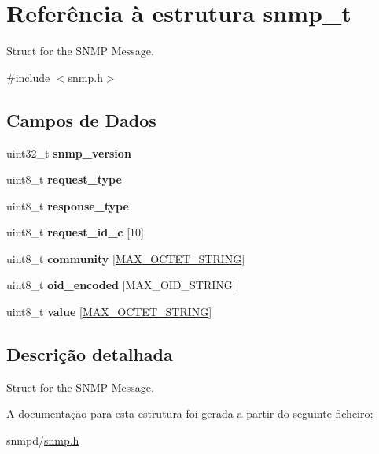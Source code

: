 \hypertarget{structsnmp__t}{\section{Referência à estrutura snmp\+\_\+t}
\label{structsnmp__t}
}


Struct for the S\+N\+M\+P Message.  




{\ttfamily \#include $<$snmp.\+h$>$}

\subsection*{Campos de Dados}
\begin{DoxyCompactItemize}
\item 
\hypertarget{structsnmp__t_a593b834134e4656a593ae9cf1ce6d201}{uint32\+\_\+t {\bfseries snmp\+\_\+version}}\label{structsnmp__t_a593b834134e4656a593ae9cf1ce6d201}

\item 
\hypertarget{structsnmp__t_acccc7895ee6181a7b3a1e15712402b55}{uint8\+\_\+t {\bfseries request\+\_\+type}}\label{structsnmp__t_acccc7895ee6181a7b3a1e15712402b55}

\item 
\hypertarget{structsnmp__t_a8ddc80b9c7bdb968e936f67c1cb61b41}{uint8\+\_\+t {\bfseries response\+\_\+type}}\label{structsnmp__t_a8ddc80b9c7bdb968e936f67c1cb61b41}

\item 
\hypertarget{structsnmp__t_a42b0bcd073d9adc8bf3e0045c3064fda}{uint8\+\_\+t {\bfseries request\+\_\+id\+\_\+c} \mbox{[}10\mbox{]}}\label{structsnmp__t_a42b0bcd073d9adc8bf3e0045c3064fda}

\item 
\hypertarget{structsnmp__t_a043bf20b6c2e89ee1df4fcc94072448d}{uint8\+\_\+t {\bfseries community} \mbox{[}\hyperlink{snmp_8h_a23bdc4d15d908a80e4bc06be55463ffc}{M\+A\+X\+\_\+\+O\+C\+T\+E\+T\+\_\+\+S\+T\+R\+I\+N\+G}\mbox{]}}\label{structsnmp__t_a043bf20b6c2e89ee1df4fcc94072448d}

\item 
\hypertarget{structsnmp__t_ab9c54bd7b1b1cffb109e66a9b3f82230}{uint8\+\_\+t {\bfseries oid\+\_\+encoded} \mbox{[}M\+A\+X\+\_\+\+O\+I\+D\+\_\+\+S\+T\+R\+I\+N\+G\mbox{]}}\label{structsnmp__t_ab9c54bd7b1b1cffb109e66a9b3f82230}

\item 
\hypertarget{structsnmp__t_a8e545ad997d63132958e084ada9ad750}{uint8\+\_\+t {\bfseries value} \mbox{[}\hyperlink{snmp_8h_a23bdc4d15d908a80e4bc06be55463ffc}{M\+A\+X\+\_\+\+O\+C\+T\+E\+T\+\_\+\+S\+T\+R\+I\+N\+G}\mbox{]}}\label{structsnmp__t_a8e545ad997d63132958e084ada9ad750}

\end{DoxyCompactItemize}


\subsection{Descrição detalhada}
Struct for the S\+N\+M\+P Message. 

A documentação para esta estrutura foi gerada a partir do seguinte ficheiro\+:\begin{DoxyCompactItemize}
\item 
snmpd/\hyperlink{snmp_8h}{snmp.\+h}\end{DoxyCompactItemize}
